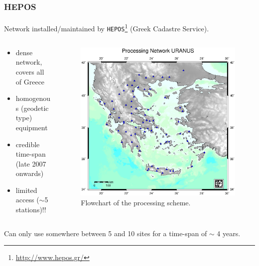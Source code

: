 \documentclass{beamer}
\begin{document}
\begin{frame}\frametitle{HEPOS}\framesubtitle{}
  Network installed/maintained by \texttt{HEPOS}\footnote{\url{http://www.hepos.gr/}} (Greek Cadastre Service). 
\begin{columns}[T] %
\begin{column}{.48\textwidth}
  \begin{itemize}
    \item<pro@1-> dense network, covers all of Greece
    \item<pro@1-> homogenous (geodetic type) equipment
    \item<con@1-> credible time-span (late 2007 onwards)
    \item<con@1-> limited access ($\sim$5 stations)!!
  \end{itemize}
\end{column}%
\hfill%
\begin{column}{.68\textwidth}
 \begin{figure}
 \begin{center}
 \includegraphics[width=.5\textwidth]{img/uranusnet.eps}
 \caption{Flowchart of the processing scheme.}
 \label{fig:dgrm}
 \end{center}
 \end{figure}
\end{column}%
\end{columns}
  \begin{block}{}
  Can only use somewhere between 5 and 10 sites for a time-span of $\sim$ 4 years.
  \end{block}
\end{frame}
\end{document}
